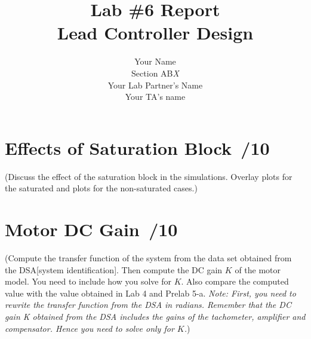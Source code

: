 \documentclass{article}
\newcommand{\score}{\hfill \underline{\hspace{0.65cm}}\,/} %
\begin{document}
%
\title{\bf Lab \#6 Report\\{\sc Lead Controller Design}}
\author{Your Name\\ Section AB\emph{X}\\
Your Lab Partner's Name\\
Your TA's name}
\maketitle

\noindent {}

\section{Effects of Saturation Block \score 10}
(Discuss the effect of the saturation block in the simulations. Overlay plots for the saturated and plots for the non-saturated cases.)




\section{Motor DC Gain \score 10}
(Compute the transfer function of the system from the data set obtained from the DSA[system identification]. Then compute the DC gain $K$ of the motor model. You need to include how you solve for $K$. Also compare the computed value with the value obtained in Lab 4 and Prelab 5-a. \emph{Note: First, you need to rewrite the transfer function from the DSA in radians. Remember that the DC gain K obtained from the DSA includes the gains of the tachometer, amplifier and compensator. Hence you need to solve only for $K$.})
\end{document}
